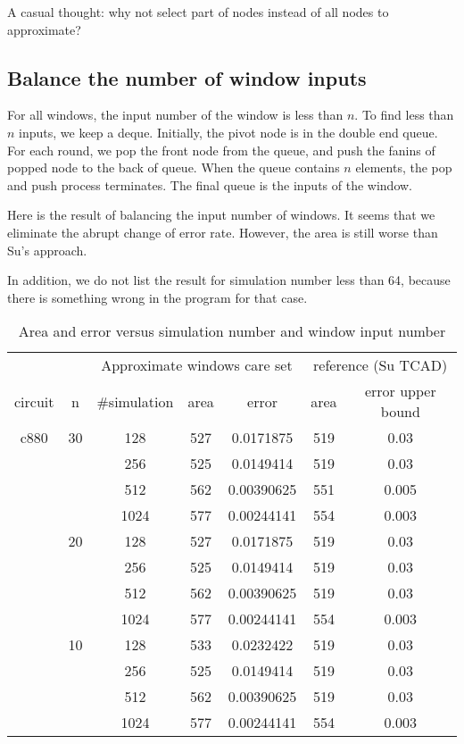 \documentclass{rpt}
\begin{document}
A casual thought: why not select part of nodes instead of all nodes to approximate?

\subsection{Balance the number of window inputs}

For all windows,
the input number of the window is less than $n$.
To find less than $n$ inputs,
we keep a deque.
Initially, the pivot node is in the double end queue.
For each round,
we pop the front node from the queue,
and push the fanins of popped node to the back of queue.
When the queue contains $n$ elements,
the pop and push process terminates.
The final queue is the inputs of the window.

Here is the result of balancing the input number of windows.
It seems that we eliminate the abrupt change of error rate.
However,
the area is still worse than Su's approach.

In addition,
we do not list the result for simulation number less than 64,
because there is something wrong in the program for that case.

\begin{table}[!htbp]
\centering
\caption{Area and error versus simulation number and window input number}
\begin{tabular}{ccccccc}
\toprule
& & \multicolumn{3}{c}{Approximate windows care set}&\multicolumn{2}{c}{reference (Su TCAD)}\\
circuit & n &\#simulation&area&error&area&error upper bound\\
\midrule
c880&30&128&527&0.0171875&519&0.03\\
&&256&525&0.0149414&519&0.03\\
&&512&562&0.00390625&551&0.005\\
&&1024&577&0.00244141&554&0.003\\
&20&128&527&0.0171875&519&0.03\\
&&256&525&0.0149414&519&0.03\\
&&512&562&0.00390625&519&0.03\\
&&1024&577&0.00244141&554&0.003\\
&10&128&533&0.0232422&519&0.03\\
&&256&525&0.0149414&519&0.03\\
&&512&562&0.00390625&519&0.03\\
&&1024&577&0.00244141&554&0.003\\
\bottomrule
\end{tabular}\label{tab:res}
\end{table}
\end{document}
